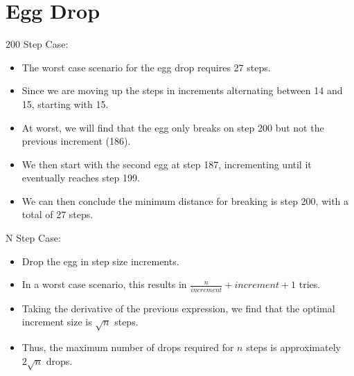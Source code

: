 \documentclass[11pt]{article}
\begin{document}
\section*{Egg Drop}
200 Step Case:
\begin{itemize}
\item The worst case scenario for the egg drop requires 27 steps.
\item Since we are moving up the steps in increments alternating between 14 and 15, starting with 15.
\item At worst, we will find that the egg only breaks on step 200 but not the previous increment (186).
\item We then start with the second egg at step 187, incrementing until it eventually reaches step 199.
\item We can then conclude the minimum distance for breaking is step 200, with a total of 27 steps.
\end{itemize}
N Step Case:
\begin{itemize}
\item Drop the egg in step size increments.
\item In a worst case scenario, this results in $\frac{n}{increment}+increment+1$ tries.
\item Taking the derivative of the previous expression, we find that the optimal increment size is $\sqrt{n}$ steps.
\item Thus, the maximum number of drops required for $n$ steps is approximately $2\sqrt{n}$ drops.
\end{itemize}
\end{document}
